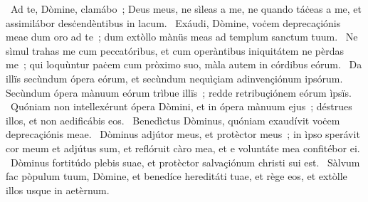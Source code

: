 ~Ad te, Dòmine, clamábo~; Deus meus, ne sìleas a me, ne quando táċeas a me, et assimilábor desċendèntibus in lacum. 
~Exáudi, Dòmine, voċem deprecaçiónis meae dum oro ad te~; dum extòllo mànüs meas ad templum sanctum tuum. 
~Ne sìmul trahas me cum peccatóribus, et cum operàntibus iniquitátem ne pèrdas me~; qui loquùntur paċem cum pròximo suo, màla autem in córdibus eórum. 
~Da illïs secùndum ópera eórum, et secùndum nequìçiam adinvençiónum ipsórum. Secùndum ópera mànuum eórum trìbue illïs~; redde retribuçiónem eórum ìpsïs. 
~Quóniam non intellexérunt ópera Dòmini, et in ópera mànuum ejus~; déstrues illos, et non aedificábis eos. 
~Benedìctus Dòminus, quóniam exaudívit voċem deprecaçiónis meae. 
~Dòminus adjútor meus, et protèctor meus~; in ìpso sperávit cor meum et adjútus sum, et reflóruit càro mea, et e voluntáte mea confitébor ei. 
~Dòminus fortitúdo plebis suae, et protèctor salvaçiónum christi sui est. 
~Sàlvum fac pòpulum tuum, Dòmine, et benedíce hereditáti tuae, et rège eos, et extòlle illos usque in aetèrnum. 
